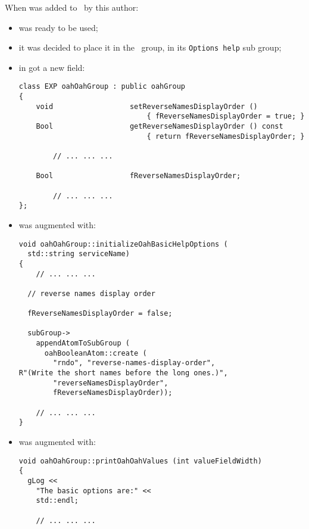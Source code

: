 When  was added to \oahRepr\ by this author:
\begin{itemize}

\item {} was ready to be used;

\item it was decided to place it in the  \oahRepr\ group, in its {\tt Options~help} sub group;

\item {} in  got a new  field:
\begin{lstlisting}[language=CPlusPlus]
class EXP oahOahGroup : public oahGroup
{
    void                  setReverseNamesDisplayOrder ()
                              { fReverseNamesDisplayOrder = true; }
    Bool                  getReverseNamesDisplayOrder () const
                              { return fReverseNamesDisplayOrder; }

		// ... ... ...

    Bool                  fReverseNamesDisplayOrder;

		// ... ... ...
};
\end{lstlisting}

\item {} was augmented with:
\begin{lstlisting}[language=CPlusPlus]
void oahOahGroup::initializeOahBasicHelpOptions (
  std::string serviceName)
{
	// ... ... ...

  // reverse names display order

  fReverseNamesDisplayOrder = false;

  subGroup->
    appendAtomToSubGroup (
      oahBooleanAtom::create (
        "rndo", "reverse-names-display-order",
R"(Write the short names before the long ones.)",
        "reverseNamesDisplayOrder",
        fReverseNamesDisplayOrder));

	// ... ... ...
}
\end{lstlisting}

\item {} was augmented with:
\begin{lstlisting}[language=CPlusPlus]
void oahOahGroup::printOahOahValues (int valueFieldWidth)
{
  gLog <<
    "The basic options are:" <<
    std::endl;

	// ... ... ...


\end{lstlisting}
\end{itemize}
